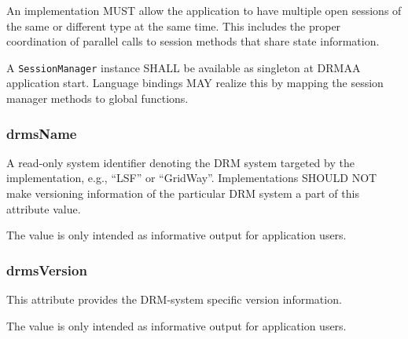 \documentclass{article}
\newcommand{\h}[1]{\lstinline|#1|}
\newcommand{\langbind}[1]{\begin{shaded}#1\end{shaded}}
\newcommand{\rat}[1]{}
\begin{document}
An implementation MUST allow the application to have multiple open sessions of the same or different type at the same time. This includes the proper coordination of parallel calls to session methods that share state information.

\langbind{
A \h{SessionManager} instance SHALL be available as singleton at DRMAA application start. Language bindings MAY realize this by mapping the session manager methods to global functions. 
}

\rat{
Comparison to DRMAA 1.0:
The concept of a factory from GFD.130 was removed (solves issue \#6276). Version 2.0 of DRMAA supports restartable sessions by the newly introduced SessionManager interface. It allows creating multiple concurrent sessions for job submission (solves issue \#2821), which can be restarted by their generated session name (solves issue \#2820). Session.init() and Session.exit() functionalities are moved to the according session creation and closing routines. The descriptions were fixed accordingly (solves issue \#2822). The AlreadyActiveSession error was removed. (F2F meeting July 2009) The drmaaImplementation attribute from DRMAA 1.0 was removed, since it was redundant to the drmsInfo attribute. This one is now available in the new SessionManager interface. (F2F meeting July 2009).

The possibility for surviving job / reservation objects on session closing was added after discussion in the Nov 30th 2011 conf call.
}

\subsubsection{drmsName}

A read-only system identifier denoting the DRM system targeted by the implementation, e.g., \enquote{LSF} or \enquote{GridWay}. Implementations SHOULD NOT make versioning information of the particular DRM system a part of this attribute value.

The value is only intended as informative output for application users.

\subsubsection{drmsVersion}

This attribute provides the DRM-system specific version information. 

The value is only intended as informative output for application users.
\end{document}
